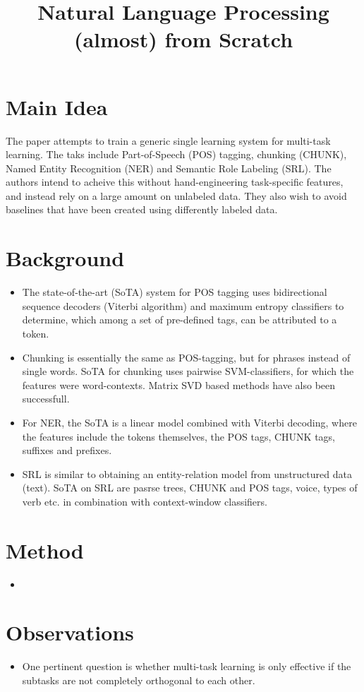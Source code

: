 \documentclass[12pt]{scrartcl}
\begin{document}
\title{Natural Language Processing (almost) from Scratch}
\author{}
\date{}
\maketitle

\section{Main Idea}
  The paper \cite{collobert2011natural} attempts to train a generic single learning system for multi-task learning. The taks include Part-of-Speech (POS) tagging, chunking (CHUNK), Named Entity Recognition (NER) and Semantic Role Labeling (SRL). The authors intend to acheive this without hand-engineering task-specific features, and instead rely on a large amount on unlabeled data. They also wish to avoid baselines that have been created using differently labeled data.
  
\section{Background}
  \begin{itemize}
    \item The state-of-the-art (SoTA) system for POS tagging uses bidirectional sequence decoders (Viterbi algorithm) and maximum entropy classifiers to determine, which among a set of pre-defined tags, can be attributed to a token.
    \item Chunking is essentially the same as POS-tagging, but for phrases instead of single words. SoTA for chunking uses pairwise SVM-classifiers, for which the features were word-contexts. Matrix SVD based methods have also been successfull.
    \item For NER, the SoTA is a linear model combined with Viterbi decoding, where the features include the tokens themselves, the POS tags, CHUNK tags, suffixes and prefixes.
    \item SRL is similar to obtaining an entity-relation model from unstructured data (text). SoTA on SRL are pasrse trees, CHUNK and POS tags, voice, types of verb etc. in combination with context-window classifiers.
  \end{itemize}

\section{Method}
  \begin{itemize}
    \item 
  \end{itemize}

\section{Observations}
  \begin{itemize}
    \item One pertinent question is whether multi-task learning is only effective if the subtasks are not completely orthogonal to each other.
  \end{itemize}



\end{document}
